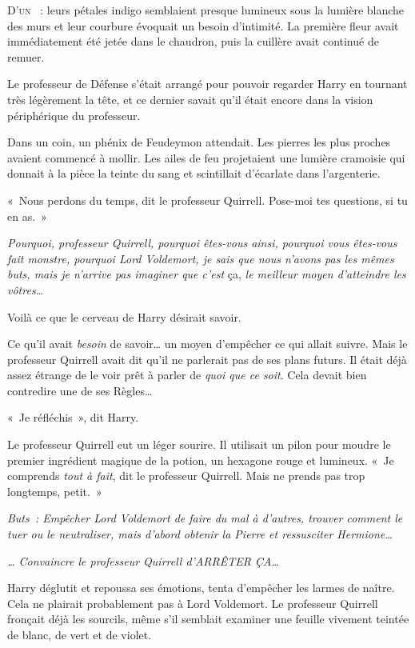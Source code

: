 
\lettrine{D}{'un} ~: leurs pétales indigo semblaient presque lumineux sous la lumière blanche des murs et leur courbure évoquait un besoin d'intimité.
La première fleur avait immédiatement été jetée dans le chaudron, puis la cuillère avait continué de remuer.

Le professeur de Défense s'était arrangé pour pouvoir regarder Harry en tournant très légèrement la tête, et ce dernier savait qu'il était encore dans la vision périphérique du professeur.

Dans un coin, un phénix de Feudeymon attendait.
Les pierres les plus proches avaient commencé à mollir.
Les ailes de feu projetaient une lumière cramoisie qui donnait à la pièce la teinte du sang et scintillait d'écarlate dans l'argenterie.

«~Nous perdons du temps, dit le professeur Quirrell.
Pose-moi tes questions, si tu en as.~»

\emph{Pourquoi, professeur Quirrell, pourquoi êtes-vous ainsi, pourquoi vous êtes-vous fait monstre, pourquoi Lord Voldemort, je sais que nous n'avons pas les mêmes buts, mais je n'arrive pas imaginer que c'est} ça, \emph{le meilleur moyen d'atteindre les vôtres…}

Voilà ce que le cerveau de Harry désirait savoir.

Ce qu'il avait \emph{besoin} de savoir… un moyen d'empêcher ce qui allait suivre.
Mais le professeur Quirrell avait dit qu'il ne parlerait pas de ses plans futurs.
Il était déjà assez étrange de le voir prêt à parler de \emph{quoi que ce soit}.
Cela devait bien contredire une de ses Règles…

«~Je réfléchis~», dit Harry.

Le professeur Quirrell eut un léger sourire.
Il utilisait un pilon pour moudre le premier ingrédient magique de la potion, un hexagone rouge et lumineux.
«~Je comprends \emph{tout à fait}, dit le professeur Quirrell.
Mais ne prends pas trop longtemps, petit.~»

\emph{Buts~: Empêcher Lord Voldemort de faire du mal à d'autres, trouver comment le tuer ou le neutraliser, mais d'abord obtenir la Pierre et ressusciter Hermione…}

\emph{… Convaincre le professeur Quirrell d'ARRÊTER ÇA…}

Harry déglutit et repoussa ses émotions, tenta d'empêcher les larmes de naître.
Cela ne plairait probablement pas à Lord Voldemort.
Le professeur Quirrell fronçait déjà les sourcils, même s'il semblait examiner une feuille vivement teintée de blanc, de vert et de violet.

